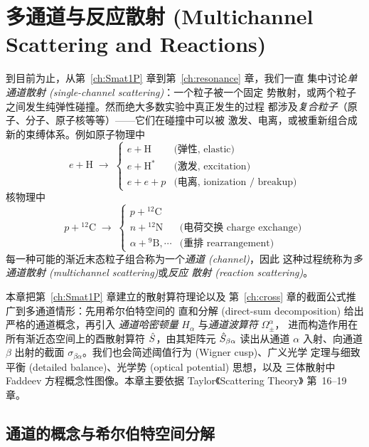 \chapter{多通道与反应散射 (Multichannel Scattering and Reactions)}\label{ch:multichannel}

到目前为止，从第~\ref{ch:Smat1P} 章到第~\ref{ch:resonance} 章，我们一直
集中讨论\emph{单通道散射 (single-channel scattering)}：一个粒子被一个固定
势散射，或两个粒子之间发生纯弹性碰撞。然而绝大多数实验中真正发生的过程
都涉及\emph{复合粒子}（原子、分子、原子核等等）——它们在碰撞中可以被
激发、电离，或被重新组合成新的束缚体系。例如原子物理中
\begin{equation}
  e + \text{H} \;\longrightarrow\;
  \begin{cases}
    e + \text{H}        & \text{(弹性, elastic)}\\
    e + \text{H}^*       & \text{(激发, excitation)}\\
    e + e + p           & \text{(电离, ionization / breakup)}
  \end{cases}
\end{equation}
核物理中
\begin{equation}
  p + {}^{12}\text{C}\;\longrightarrow\;
  \begin{cases}
    p + {}^{12}\text{C}\\
    n + {}^{12}\text{N}     & \text{(电荷交换 charge exchange)}\\
    \alpha + {}^{9}\text{B}, \cdots & \text{(重排 rearrangement)}
  \end{cases}
\end{equation}
每一种可能的渐近末态粒子组合称为一个\emph{通道 (channel)}，因此
这种过程统称为\emph{多通道散射 (multichannel scattering)}或\emph{反应
散射 (reaction scattering)}。

本章把第~\ref{ch:Smat1P} 章建立的散射算符理论以及
第~\ref{ch:cross} 章的截面公式推广到多通道情形：先用希尔伯特空间的
直和分解 (direct-sum decomposition) 给出严格的通道概念，再引入
\emph{通道哈密顿量} $H_\alpha$ 与\emph{通道波算符} $\Omega_\pm^\alpha$，
进而构造作用在所有渐近态空间上的酉散射算符 $\hat{S}$，由其矩阵元
$\hat{S}_{\beta\alpha}$ 读出从通道 $\alpha$ 入射、向通道 $\beta$ 出射的截面
$\sigma_{\beta\alpha}$。我们也会简述阈值行为 (Wigner cusp)、广义光学
定理与细致平衡 (detailed balance)、光学势 (optical potential) 思想，以及
三体散射中 Faddeev 方程概念性图像。本章主要依据 Taylor《Scattering Theory》
第~16--19 章。

\section{通道的概念与希尔伯特空间分解}
\label{sec:multich-channels}

